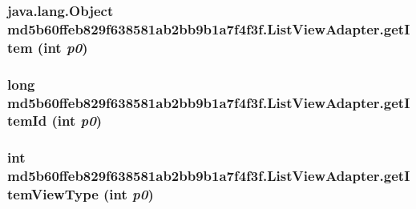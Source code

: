 \hypertarget{classmd5b60ffeb829f638581ab2bb9b1a7f4f3f_1_1_list_view_adapter_73d2d62a8f9f049e63781a1a8f96b232}{
\subsubsection[{getItem}]{\setlength{\rightskip}{0pt plus 5cm}java.lang.Object md5b60ffeb829f638581ab2bb9b1a7f4f3f.ListViewAdapter.getItem (int {\em p0})}}
\label{classmd5b60ffeb829f638581ab2bb9b1a7f4f3f_1_1_list_view_adapter_73d2d62a8f9f049e63781a1a8f96b232}


\hypertarget{classmd5b60ffeb829f638581ab2bb9b1a7f4f3f_1_1_list_view_adapter_9bf248f34b601de71eb45468af4d5230}{
\subsubsection[{getItemId}]{\setlength{\rightskip}{0pt plus 5cm}long md5b60ffeb829f638581ab2bb9b1a7f4f3f.ListViewAdapter.getItemId (int {\em p0})}}
\label{classmd5b60ffeb829f638581ab2bb9b1a7f4f3f_1_1_list_view_adapter_9bf248f34b601de71eb45468af4d5230}


\hypertarget{classmd5b60ffeb829f638581ab2bb9b1a7f4f3f_1_1_list_view_adapter_c49d0d79db395817151bc8bb649e6a4f}{
\subsubsection[{getItemViewType}]{\setlength{\rightskip}{0pt plus 5cm}int md5b60ffeb829f638581ab2bb9b1a7f4f3f.ListViewAdapter.getItemViewType (int {\em p0})}}
\label{classmd5b60ffeb829f638581ab2bb9b1a7f4f3f_1_1_list_view_adapter_c49d0d79db395817151bc8bb649e6a4f}


